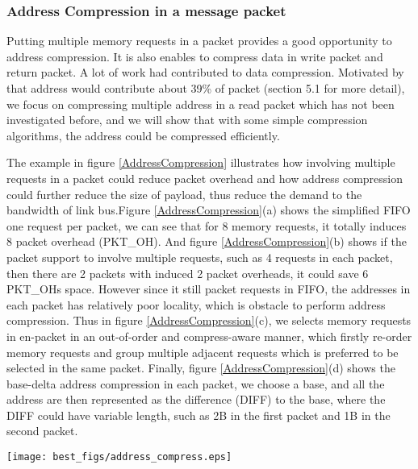 \documentclass[pageno]{jpaper}
\begin{document}
\subsubsection {Address Compression in a message packet}

Putting multiple memory requests in a packet provides a good opportunity to  address compression. It is also enables to compress data in write packet and  return packet. A lot of work had contributed to data compression. Motivated by that address would contribute about 39\% of packet (section 5.1 for more detail), we focus on compressing multiple address in a read packet which has not been investigated before, and we will show that with some simple compression algorithms, the address could be compressed efficiently.







The example in figure \ref{AddressCompression} illustrates how involving multiple requests in a packet could reduce packet overhead and how address compression could further reduce the size of payload, thus reduce the demand to the bandwidth of link bus.Figure \ref{AddressCompression}(a) shows the simplified FIFO one request per packet, we can see that for 8 memory requests, it totally induces 8 packet overhead (PKT\_OH). And figure \ref{AddressCompression}(b) shows if the packet support to involve multiple requests, such as 4 requests in each packet, then there are 2 packets with induced 2 packet overheads, it could save 6 PKT\_OHs space. However since it still packet requests in FIFO, the addresses in each packet has relatively poor locality, which is obstacle to perform address compression. Thus in figure \ref{AddressCompression}(c), we selects memory requests in en-packet in an out-of-order and compress-aware manner, which firstly re-order memory requests and group multiple adjacent requests which is preferred to be selected in the same packet. Finally, figure \ref{AddressCompression}(d) shows the base-delta address compression in each packet, we choose a base, and all the address are then represented as the difference (DIFF) to the base, where the DIFF could have variable length, such as 2B in the first packet and 1B in the second packet.

\begin{figure*}
  \centering
  \texttt{[image: best\_figs/address\_compress.eps]}
  \caption{Conceptual example showing the benefit of involving multiple requests in a packet: packet overhead reduction and address compression. (a) FIFO with one request in each packet. (b) FIFO with multiple requests in each packet. (c) Out-of-order compressed-aware requests grouping. (d) Address compression in each packet.}
  \label{AddressCompression}
\end{figure*}
\end{document}
